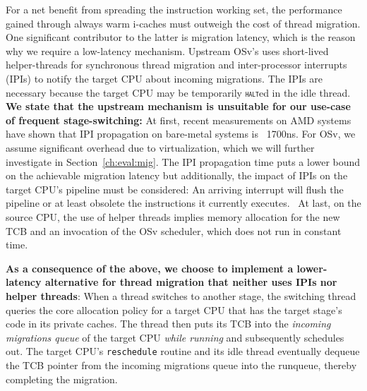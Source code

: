 \documentclass[12pt,a4paper]{book}
\begin{document}
For a net benefit from spreading the instruction working set, the performance gained through always warm i-caches must outweigh the cost of thread migration.
One significant contributor to the latter is migration latency, which is the reason why we require a low-latency mechanism.
Upstream OSv's uses short-lived helper-threads for synchronous thread migration and inter-processor interrupts (IPIs) to notify the target CPU about incoming migrations.
The IPIs are necessary because the target CPU may be temporarily \textsc{\texttt{halt}}ed in the idle thread.
\textbf{We state that the upstream mechanism is unsuitable for our use-case of frequent stage-switching:}
At first, recent measurements on AMD systems have shown that IPI propagation on bare-metal systems is ~1700ns. %
For OSv, we assume significant overhead due to virtualization, which we will further investigate in Section~\ref{ch:eval:mig}.
The IPI propagation time puts a lower bound on the achievable migration latency but additionally, the impact of IPIs on the target CPU's pipeline must be considered:
An arriving interrupt will flush the pipeline or at least obsolete the instructions it currently executes.~\cite{ipiLatencyPopcornLinux}
At last, on the source CPU, the use of helper threads implies memory allocation for the new TCB and an invocation of the OSv scheduler, which does not run in constant time.

\textbf{As a consequence of the above, we choose to implement a lower-latency alternative for thread migration that neither uses IPIs nor helper threads}:
When a thread switches to another stage, the switching thread queries the core allocation policy for a target CPU that has the target stage's code in its private caches.
The thread then puts its TCB into the \emph{incoming migrations queue} of the target CPU \emph{while running} and subsequently schedules out.
The target CPU's \lstinline{reschedule} routine and its idle thread eventually dequeue the TCB pointer from the incoming migrations queue into the runqueue, thereby completing the migration.
\end{document}
